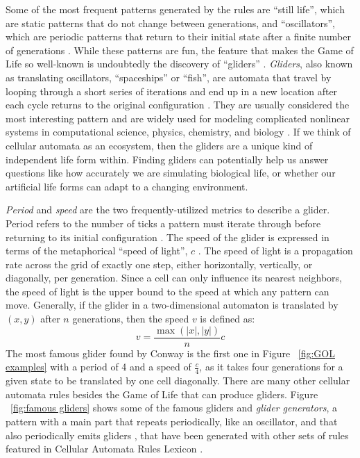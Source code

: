 \documentclass[12pt]{article}
\numberwithin{figure}{section} %
\begin{document}
Some of the most frequent patterns generated by the rules are “still life”, which are static patterns that do not change between generations, and “oscillators”, which are periodic patterns that return to their initial state after a finite number of generations \cite{Cellular automaton}. While these patterns are fun, the feature that makes the Game of Life so well-known is undoubtedly the discovery of “gliders” \cite{Glider}. \textit{Gliders}, also known as translating oscillators, “spaceships” or “fish”, are automata that travel by looping through a short series of iterations and end up in a new location after each cycle returns to the original configuration \cite{rake}. They are usually considered the most interesting pattern and are widely used for modeling complicated nonlinear systems in computational science, physics, chemistry, and biology \cite{Cellular automaton}. If we think of cellular automata as an ecosystem, then the gliders are a unique kind of independent life form within. Finding gliders can potentially help us answer questions like how accurately we are simulating biological life, or whether our artificial life forms can adapt to a changing environment. 

\textit{Period} and \textit{speed} are the two frequently-utilized metrics to describe a glider. Period refers to the number of ticks a pattern must iterate through before returning to its initial configuration \cite{The Game of Life}. The speed of the glider is expressed in terms of the metaphorical “speed of light”, $c$ \cite{spaceship, speed of light}. The speed of light is a propagation rate across the grid of exactly one step, either horizontally, vertically, or diagonally, per generation. Since a cell can only influence its nearest neighbors, the speed of light is the upper bound to the speed at which any pattern can move. Generally, if the glider in a two-dimensional automaton is translated by $(x,y)$ after $n$ generations, then the speed $v$ is defined as: 
$$v = \frac{\max{(|x|, |y|)}}{n}c$$
The most famous glider found by Conway is the first one in Figure ~\ref{fig:GOL examples} with a period of 4 and a speed of $\frac{c}{4}$, as it takes four generations for a given state to be translated by one cell diagonally. There are many other cellular automata rules besides the Game of Life that can produce gliders. Figure ~\ref{fig:famous gliders} shows some of the famous gliders and \textit{glider generators}, a pattern with a main part that repeats periodically, like an oscillator, and that also periodically emits gliders \cite{gun}, that have been generated with other sets of rules featured in Cellular Automata Rules Lexicon \cite{Lexicon}. 
\end{document}
